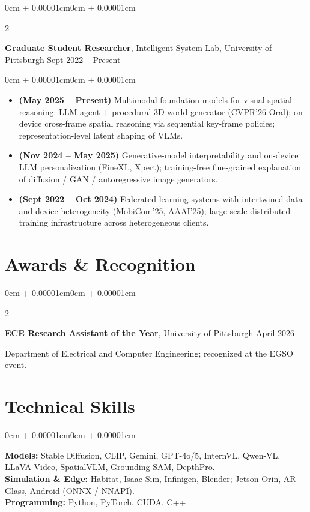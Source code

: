\documentclass[10pt, letterpaper]{article}
\newenvironment{highlights}{
    \begin{itemize}[topsep=0.08cm,parsep=0.08cm,partopsep=0pt,itemsep=0pt,leftmargin=0cm + 10pt]
}{\end{itemize}}
\newenvironment{onecolentry}{
    \begin{adjustwidth}{0cm + 0.00001cm}{0cm + 0.00001cm}
}{\end{adjustwidth}}
\newenvironment{twocolentry}[2][]{
    \onecolentry
    \def\secondColumn{#2}
    \setcolumnwidth{\fill, 4.5cm}
    \begin{paracol}{2}
}{\switchcolumn \raggedleft \secondColumn \end{paracol} \endonecolentry}
\begin{document}
\begin{twocolentry}{Sept 2022 -- Present}
    \textbf{Graduate Student Researcher}, Intelligent System Lab, University of Pittsburgh
\end{twocolentry}
\vspace{0.06cm}
\begin{onecolentry}
\begin{highlights}
    \item \textbf{(May 2025 -- Present)} Multimodal foundation models for visual spatial reasoning: LLM-agent + procedural 3D world generator (CVPR'26 Oral); on-device cross-frame spatial reasoning via sequential key-frame policies; representation-level latent shaping of VLMs.
    \item \textbf{(Nov 2024 -- May 2025)} Generative-model interpretability and on-device LLM personalization (FineXL, Xpert); training-free fine-grained explanation of diffusion / GAN / autoregressive image generators.
    \item \textbf{(Sept 2022 -- Oct 2024)} Federated learning systems with intertwined data and device heterogeneity (MobiCom'25, AAAI'25); large-scale distributed training infrastructure across heterogeneous clients.
\end{highlights}
\end{onecolentry}

\section{Awards \& Recognition}

\begin{twocolentry}{April 2026}
    \textbf{ECE Research Assistant of the Year}, University of Pittsburgh
\end{twocolentry}
\vspace{0.04cm}
{\small Department of Electrical and Computer Engineering; recognized at the EGSO event.}

\section{Technical Skills}
\begin{onecolentry}
\textbf{Models:} Stable Diffusion, CLIP, Gemini, GPT-4o/5, InternVL, Qwen-VL, LLaVA-Video, SpatialVLM, Grounding-SAM, DepthPro.\\[2pt]
\textbf{Simulation \& Edge:} Habitat, Isaac Sim, Infinigen, Blender; Jetson Orin, AR Glass, Android (ONNX / NNAPI).\\[2pt]
\textbf{Programming:} Python, PyTorch, CUDA, C++.
\end{onecolentry}
\end{document}
